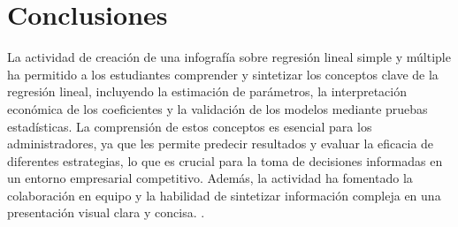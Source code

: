 {\section{Conclusiones}
La actividad de creación de una infografía sobre regresión lineal simple y múltiple ha permitido a los estudiantes comprender y sintetizar los conceptos clave de la regresión lineal, incluyendo la estimación de parámetros, la interpretación económica de los coeficientes y la validación de los modelos mediante pruebas estadísticas. La comprensión de estos conceptos es esencial para los administradores, ya que les permite predecir resultados y evaluar la eficacia de diferentes estrategias, lo que es crucial para la toma de decisiones informadas en un entorno empresarial competitivo. Además, la actividad ha fomentado la colaboración en equipo y la habilidad de sintetizar información compleja en una presentación visual clara y concisa. \citep{anderson2012,lind2012,wackerly2010,diazRodriguez2022}.
}

